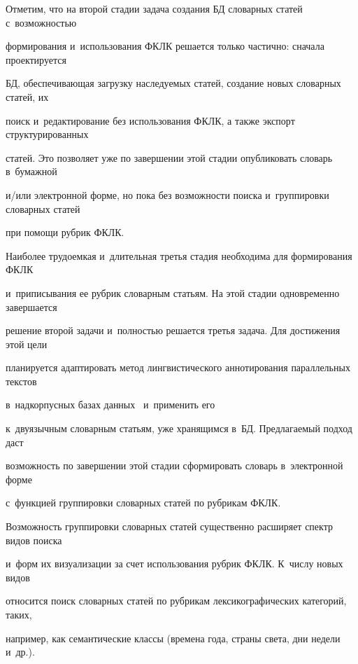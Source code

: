   

  Отметим, что на второй стадии задача создания БД словарных статей с~возможностью 

формирования и~использования ФКЛК решается только частично: сначала проектируется 

БД, обеспечивающая загрузку наследуемых статей, создание новых словарных статей, их 

поиск и~редактирование без использования ФКЛК, а также экспорт структурированных 

статей. Это позволяет уже по завершении этой стадии опубликовать словарь в~бумажной 

и/или электронной форме, но пока без возможности поиска и~группировки словарных статей 

при помощи рубрик ФКЛК.

  

  Наиболее трудоемкая и~длительная третья стадия необходима для формирования ФКЛК 

и~приписывания ее рубрик словарным статьям. На этой стадии одновременно завершается 

решение второй задачи и~полностью решается третья задача. Для достижения этой цели 

планируется адаптировать метод лингвистического аннотирования параллельных текстов 

в~надкорпусных базах данных~\cite{13-vz, 14-vz, 15-vz, 16-vz} и~применить его 

к~двуязычным словарным статьям, уже хранящимся в~БД. Предлагаемый подход даст 

возможность по завершении этой стадии сформировать словарь в~электронной форме 

с~функцией группировки словарных статей по рубрикам ФКЛК.

  

  Возможность группировки словарных статей существенно расширяет спектр видов поиска 

и~форм их визуализации за счет использования рубрик ФКЛК. К~числу новых видов 

относится поиск словарных статей по рубрикам лексикографических категорий, таких, 

например, как семантические классы (времена года, страны света, дни недели и~др.).

  

